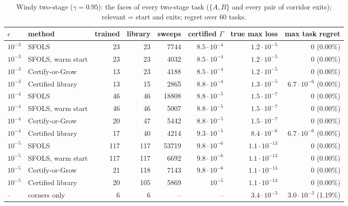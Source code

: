 \begin{table}[h]\centering\small
\caption{Windy two-stage ($\gamma=0.95$): the faces of every two-stage task ($\{A,B\}$ and every pair of corridor exits); relevant = start and exits; regret over 60 tasks.}\label{tab:windy}
\begin{tabular}{llrrrrrr}
\toprule
$\epsilon$ & method & trained & library & sweeps & certified $\Gamma$ & true max loss & max task regret\\
\midrule
$10^{-3}$ & SFOLS & 23 & 23 & 7744 & $8.5\cdot10^{-4}$ & $1.2\cdot10^{-5}$ & 0 (0.00\%)\\
$10^{-3}$ & SFOLS, warm start & 23 & 23 & 4032 & $8.5\cdot10^{-4}$ & $1.2\cdot10^{-5}$ & 0 (0.00\%)\\
$10^{-3}$ & Certify-or-Grow & 13 & 23 & 4188 & $8.5\cdot10^{-4}$ & $1.2\cdot10^{-5}$ & 0 (0.00\%)\\
$10^{-3}$ & Certified library & 13 & 15 & 2865 & $8.8\cdot10^{-4}$ & $1.3\cdot10^{-5}$ & $6.7\cdot10^{-6}$ (0.00\%)\\
\midrule
$10^{-4}$ & SFOLS & 46 & 46 & 18808 & $8.8\cdot10^{-5}$ & $1.5\cdot10^{-7}$ & 0 (0.00\%)\\
$10^{-4}$ & SFOLS, warm start & 46 & 46 & 5007 & $8.8\cdot10^{-5}$ & $1.5\cdot10^{-7}$ & 0 (0.00\%)\\
$10^{-4}$ & Certify-or-Grow & 20 & 47 & 5442 & $8.8\cdot10^{-5}$ & $1.5\cdot10^{-7}$ & 0 (0.00\%)\\
$10^{-4}$ & Certified library & 17 & 40 & 4214 & $9.3\cdot10^{-5}$ & $8.4\cdot10^{-6}$ & $6.7\cdot10^{-6}$ (0.00\%)\\
\midrule
$10^{-5}$ & SFOLS & 117 & 117 & 53719 & $9.8\cdot10^{-6}$ & $1.1\cdot10^{-13}$ & 0 (0.00\%)\\
$10^{-5}$ & SFOLS, warm start & 117 & 117 & 6692 & $9.8\cdot10^{-6}$ & $1.1\cdot10^{-13}$ & 0 (0.00\%)\\
$10^{-5}$ & Certify-or-Grow & 21 & 118 & 7143 & $9.8\cdot10^{-6}$ & $1.1\cdot10^{-13}$ & 0 (0.00\%)\\
$10^{-5}$ & Certified library & 20 & 105 & 5869 & $10^{-5}$ & $1.1\cdot10^{-13}$ & 0 (0.00\%)\\
\midrule
-- & corners only & 6 & 6 & -- & -- & $3.4\cdot10^{-3}$ & $3.0\cdot10^{-3}$ (1.19\%)\\
\bottomrule
\end{tabular}
\end{table}

